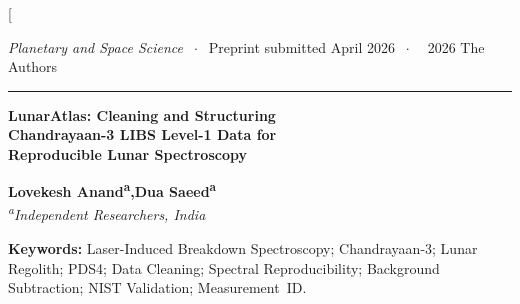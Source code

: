 \documentclass[a4paper,twocolumn,10pt]{article}
\begin{document}
\twocolumn[{%
\begin{@twocolumnfalse}

\noindent
{\footnotesize\textit{Planetary and Space Science} $\;\cdot\;$
Preprint submitted April 2026 $\;\cdot\;$
\textcopyright~2026 The Authors}
\par\vspace{8pt}\hrule\vspace{10pt}

{\centering
{\LARGE\bfseries LunarAtlas: Cleaning and Structuring\\[4pt]
Chandrayaan-3 LIBS Level-1 Data for\\[4pt]
Reproducible Lunar Spectroscopy}\par
\vspace{8pt}
{\normalsize\bfseries Lovekesh Anand\textsuperscript{a},\quad Dua Saeed\textsuperscript{a}}\\[3pt]
{\small\textit{\textsuperscript{a}Independent Researchers, India}}
\par
}

\vspace{10pt}
\begin{abstract}
\noindent
We present \textbf{LunarAtlas}, a reproducible data-processing
infrastructure that transforms publicly available Chandrayaan-3
Laser-Induced Breakdown Spectroscopy (LIBS) Level-1 (L1) products
into cleaned, machine-accessible, long-form spectral records suitable
for quantitative lunar science.
Starting from calibrated L1 tables released through ISRO's
PDS4-compliant archive, LunarAtlas implements a transparent Python
pipeline that: (i)~parses XML metadata; (ii)~reshapes wide-format
Chandrayaan-3 L1 tables---in which 2\,049 wavelength channels appear
as column headers spanning \SIrange{164.35}{878.26}{\nano\metre}---into
normalised per-wavelength long-form records; (iii)~identifies and
correctly pairs plasma and background measurements using mission flag
columns (\texttt{Laser\_Fire\_Status}, \texttt{Force\_Reset\_Status});
and (iv)~performs physically motivated background subtraction,
$I_{\text{clean}}(\lambda) = \max(0,\,I_{\text{plasma}}(\lambda)
- I_{\text{background}}(\lambda))$, with non-physical negatives
clamped to zero.
Each processed file receives an MD5 checksum and an algorithm version
record.
Applied to \texttt{ch3\_lib\_002\_20230825T104221\_00\_l1.csv}, the
pipeline yields four cleaned measurements (\textbf{Measurement~IDs~1--4}),
each with 2\,094 wavelength channels and 19 metadata columns.
A baseline suppression factor of $\sim$7.1 and a high-frequency
variance increase of $\sim$3.9 are observed, validating the physical
correctness of the pipeline.
LunarAtlas further provides a PDS4-aware PostgreSQL schema, adaptive
min--max downsampling with a mathematically defined zoom-saturation
criterion, and a versioned API with sub-\SI{500}{\milli\second}
response times.
\end{abstract}
\vspace{4pt}
\noindent\textbf{Keywords:} Laser-Induced Breakdown Spectroscopy;
Chandrayaan-3; Lunar Regolith; PDS4; Data Cleaning; Spectral
Reproducibility; Background Subtraction; NIST Validation;
Measurement~ID.


\end{@twocolumnfalse}}
\end{document}
